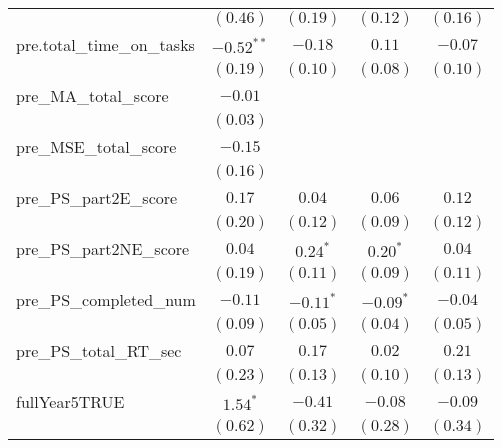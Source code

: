 \begin{center}
\begin{longtable}{l c c c c}
                                                   & $(0.46)$     & $(0.19)$     & $(0.12)$     & $(0.16)$     \\
pre.total\_time\_on\_tasks                         & $-0.52^{**}$ & $-0.18$      & $0.11$       & $-0.07$      \\
                                                   & $(0.19)$     & $(0.10)$     & $(0.08)$     & $(0.10)$     \\
pre\_MA\_total\_score                              & $-0.01$      &              &              &              \\
                                                   & $(0.03)$     &              &              &              \\
pre\_MSE\_total\_score                             & $-0.15$      &              &              &              \\
                                                   & $(0.16)$     &              &              &              \\
pre\_PS\_part2E\_score                             & $0.17$       & $0.04$       & $0.06$       & $0.12$       \\
                                                   & $(0.20)$     & $(0.12)$     & $(0.09)$     & $(0.12)$     \\
pre\_PS\_part2NE\_score                            & $0.04$       & $0.24^{*}$   & $0.20^{*}$   & $0.04$       \\
                                                   & $(0.19)$     & $(0.11)$     & $(0.09)$     & $(0.11)$     \\
pre\_PS\_completed\_num                            & $-0.11$      & $-0.11^{*}$  & $-0.09^{*}$  & $-0.04$      \\
                                                   & $(0.09)$     & $(0.05)$     & $(0.04)$     & $(0.05)$     \\
pre\_PS\_total\_RT\_sec                            & $0.07$       & $0.17$       & $0.02$       & $0.21$       \\
                                                   & $(0.23)$     & $(0.13)$     & $(0.10)$     & $(0.13)$     \\
fullYear5TRUE                                      & $1.54^{*}$   & $-0.41$      & $-0.08$      & $-0.09$      \\
                                                   & $(0.62)$     & $(0.32)$     & $(0.28)$     & $(0.34)$     \\

\end{longtable}
\end{center}
